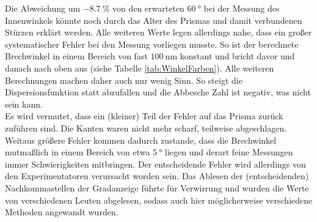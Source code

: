 Die Abweichung um $\SI{-8.7}{\%}$ von den erwarteten $\SI{60}{\degree}$ bei der Messung des Innenwinkels könnte noch durch das Alter des Prismas und damit verbundenen Stürzen erklärt werden. Alle weiteren Werte legen allerdings nahe, dass ein großer systematischer Fehler bei den Messung vorliegen musste. So ist der berechnete Brechwinkel in einem Bereich von fast $\SI{100}{\nano\meter}$ konstant und bricht davor und danach nach oben aus (siehe Tabelle \ref{tab:WinkelFarben}). Alle weiteren Berechnungen machen daher auch nur wenig Sinn. So steigt die Dispersionsfunktion statt abzufallen und die Abbesche Zahl ist negativ, was nicht sein kann. \\
Es wird vermutet, dass ein (kleiner) Teil der Fehler auf das Prisma zurück zuführen sind. Die Kanten waren nicht mehr scharf, teilweise abgeschlagen. Weitaus größere Fehler kommen dadurch zustande, dass die Brechwinkel mutmaßlich in einem Bereich von etwa $\SI{5}{\degree}$ liegen und derart feine Messungen immer Schwierigkeiten mitbringen. Der entscheidende Fehler wird allerdings von den Experimentatoren verursacht worden sein. Das Ablesen der (entscheidenden) Nachkommastellen der Gradanzeige führte für Verwirrung und wurden die Werte von verschiedenen Leuten abgelesen, sodass auch hier möglicherweise verschiedene Methoden angewandt wurden.